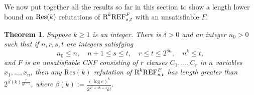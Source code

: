 \documentclass[10pt,a4paper]{article}
\newtheorem{theorem}{Theorem}
\theoremstyle{remark}
\newtheorem*{switching lemma}{Switching Lemma}
\newtheorem*{open problem}{Open Problem}
\theoremstyle{definition}
\begin{document}
We now put together all the results so far in this section to show a length lower bound on $\textnormal{Res}(k)$ refutations of $\textnormal{R}^k\textnormal{REF}^{F}_{s,t}$ with an unsatisfiable $F$. 

\begin{theorem}
\label{thm:main_size_lb_for_RkREF^F_st}
Suppose $k \geq 1$ is an integer. There is $\delta > 0$ and an integer $n_0 > 0$ such that if $n,r,s,t$ are integers satisfying 
\begin{equation}
\label{eq:conditions_on_n,r,s,t_in_the_main_theorem} 
n_0 \leq n, \quad n+1 \leq s \leq t, \quad r \leq t \leq 2^{\delta n}, \quad n^k \leq t,
\end{equation}
and $F$ is an unsatisfiable CNF consisting of $r$ clauses $C_1,\ldots, C_r$ in $n$ variables $x_1,\ldots, x_n$, then any $\text{Res}(k)$ refutation of $\textnormal{R}^k\textnormal{REF}^{F}_{s,t}$ has length greater than $2^{\beta(k) \frac{t}{n^{k-1}}}$, where $\beta(k) := \frac{(\log e)^k}{2^{k^2 + 4k + 4} k!}$. 
\end{theorem}
\end{document}

